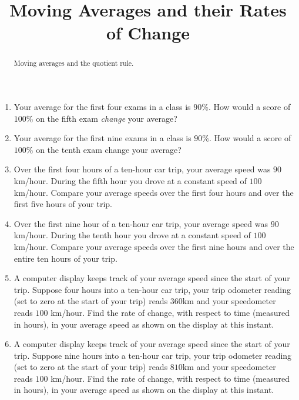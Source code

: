 \documentclass{ximera}
\title{Moving Averages and their Rates of Change}
\begin{document}
\begin{abstract}
Moving averages and the quotient rule.
\end{abstract}
\maketitle


\begin{question} \label{QPderRERglO}
\begin{enumerate}
\item Your average for the first four exams in a class is $90\%$. How would a score of $100\%$ on the fifth exam \emph{change} your average?

\item Your average for the first nine exams in a class is $90\%$. How would a score of $100\%$ on the tenth exam change your average?

\item Over the first four hours of a ten-hour car trip, your average speed was $90$ km/hour. During the fifth hour you drove at a constant speed of $100$ km/hour. Compare your average speeds over the first four hours and over the first five hours of your trip.

\item  Over the first nine hour of a ten-hour car trip, your average speed was $90$ km/hour. During the tenth hour you drove at a constant speed of $100$ km/hour. Compare your average speeds over the first nine hours and over the entire ten hours of your trip.

\item A computer display keeps track of your average speed since the start of your trip. Suppose four hours into a ten-hour car trip, your trip odometer reading (set to zero at the start of your trip) reads $360$km and your speedometer reads $100$ km/hour. Find the rate of change, with respect to time (measured in hours), in your average speed as shown on the display at this instant.

\item A computer display keeps track of your average speed since the start of your trip. Suppose nine hours into a ten-hour car trip, your trip odometer reading (set to zero at the start of your trip) reads $810$km and your speedometer reads $100$ km/hour. Find the rate of change, with respect to time (measured in hours), in your average speed as shown on the display at this instant.

\end{enumerate}
\end{question}
\end{document}
